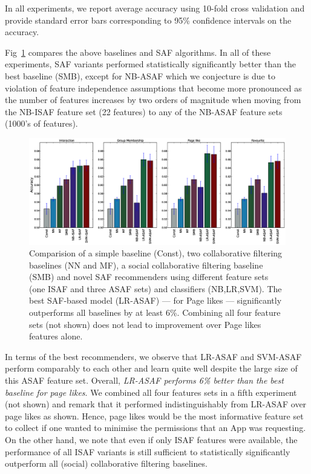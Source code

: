 In all experiments, we report average accuracy using 10-fold cross
validation and provide standard error bars corresponding to 95\% confidence
intervals on the accuracy.

Fig~\ref{Fig1} compares the above baselines and SAF algorithms.  In
all of these experiments, SAF variants performed statistically
significantly better than the best baseline (SMB), except for NB-ASAF
which we conjecture is due to violation of feature independence
assumptions that become more pronounced as the number of features
increases by two orders of magnitude when moving from the NB-ISAF
feature set (22 features) to any of the NB-ASAF feature sets (1000's
of features).

\begin{figure}[tbp!]
\hspace{-6mm}\includegraphics[width=190mm]{data/plots/accuracy/accuracyLargeNew.eps}
\caption{Comparision of a simple baseline (Const), two collaborative
  filtering baselines (NN and MF), a social collaborative filtering
  baseline (SMB) and novel SAF recommenders using different feature
  sets (one ISAF and three ASAF sets) and classifiers (NB,LR,SVM).
  The best SAF-based model (LR-ASAF) --- for Page likes --- significantly outperforms
  all baselines by at least 6\%.  Combining all four feature sets (not shown)
  does not lead to improvement over Page likes features alone.}
\label{Fig1}
\end{figure}

In terms of the best recommenders, we observe that LR-ASAF and
SVM-ASAF perform comparably to each other and learn quite well despite
the large size of this ASAF feature set.  Overall, \emph{LR-ASAF
  performs 6\% better than the best baseline for page likes}.  We
combined all four features sets in a fifth experiment (not shown) and
remark that it performed indistinguishably from LR-ASAF over page
likes as shown.  Hence, page likes would be the most informative
feature set to collect if one wanted to minimise the permissions that
an App was requesting.  On the other hand, we note that even if only
ISAF features were available, the performance of all ISAF variants is
still sufficient to statistically significantly outperform all
(social) collaborative filtering baselines.

